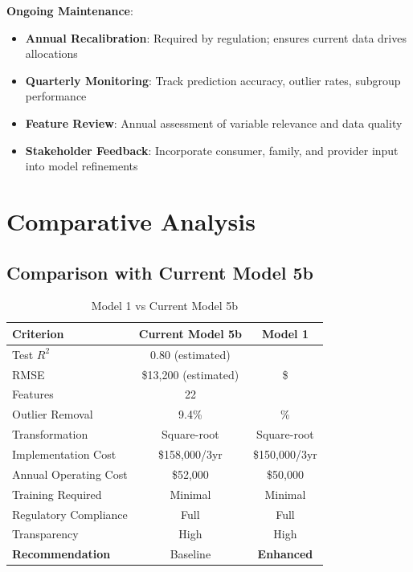 \textbf{Ongoing Maintenance}:
\begin{itemize}
    \item \textbf{Annual Recalibration}: Required by regulation; ensures current data drives allocations
    \item \textbf{Quarterly Monitoring}: Track prediction accuracy, outlier rates, subgroup performance
    \item \textbf{Feature Review}: Annual assessment of variable relevance and data quality
    \item \textbf{Stakeholder Feedback}: Incorporate consumer, family, and provider input into model refinements
\end{itemize}

\section{Comparative Analysis}

\subsection{Comparison with Current Model 5b}

\begin{table}[h]
\centering
\caption{Model 1 vs Current Model 5b}
\begin{tabular}{lcc}
\toprule
\textbf{Criterion} & \textbf{Current Model 5b} & \textbf{Model 1} \\
\midrule
Test $R^2$ & 0.80 (estimated) & \ModelOneRSquaredTest{} \\
RMSE & \$13,200 (estimated) & \$\ModelOneRMSETest{} \\
Features & 22 & \ModelOneNumFeatures{} \\
Outlier Removal & 9.4\% & \ModelOneOutlierPercentage{}\% \\
Transformation & Square-root & Square-root \\
Implementation Cost & \$158,000/3yr & \$150,000/3yr \\
Annual Operating Cost & \$52,000 & \$50,000 \\
Training Required & Minimal & Minimal \\
Regulatory Compliance & Full & Full \\
Transparency & High & High \\
\midrule
\textbf{Recommendation} & Baseline & \textbf{Enhanced} \\
\bottomrule
\end{tabular}
\end{table}

